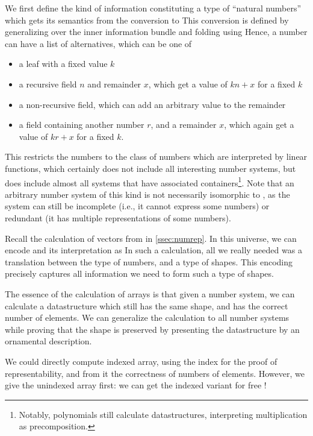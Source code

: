 We first define the kind of information constituting a type of ``natural numbers''
which gets its semantics from the conversion to \bN{}
This conversion is defined by generalizing over the inner information bundle and folding using
Hence, a number can have a list of alternatives, which can be one of
\begin{itemize}
    \item a leaf with a fixed value $k$
    \item a recursive field $n$ and remainder $x$, which get a value of $kn + x$ for a fixed $k$
    \item a non-recursive field, which can add an arbitrary value to the remainder
    \item a field containing another number $r$, and a remainder $x$, which again get a value of $kr + x$ for a fixed $k$.
\end{itemize}
This restricts the numbers to the class of numbers which are interpreted by linear functions, which certainly does not include all interesting number systems, but does include almost all systems that have associated containers\footnote{Notably, polynomials still calculate datastructures, interpreting multiplication as precomposition.}. Note that an arbitrary number system of this kind is not necessarily isomorphic to \bN{}, as the system can still be incomplete (i.e., it cannot express some numbers) or redundant (it has multiple representations of some numbers).

Recall the calculation of vectors from \bN{} in \autoref{ssec:numrep}. In this universe, we can encode \bN{} and its interpretation as
In such a calculation, all we really needed was a translation between the type of numbers, and a type of shapes. This encoding precisely captures all information we need to form such a type of shapes.

The essence of the calculation of arrays is that given a number system, we can calculate a datastructure which still has the same shape, and has the correct number of elements. We can generalize the calculation to all number systems while proving that the shape is preserved by presenting the datastructure by an ornamental description.

We could directly compute indexed array, using the index for the proof of representability, and from it the correctness of numbers of elements. However, we give the unindexed array first: we can get the indexed variant for free \cite{algorn}!

